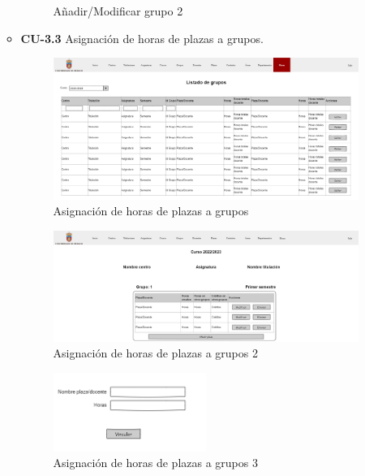 \begin{itemize}
\begin{itemize}
\begin{figure}[!h]
		\caption{Añadir/Modificar grupo 2}
		\end{figure}
		\FloatBarrier
		\newpage
		\item \textbf{CU-3.3} Asignación de horas de plazas a grupos.
		\begin{figure}[!h]
		\centering
		\includegraphics[width=\textwidth]{../img/Anexos/Vistas/horas.png}
		\caption{Asignación de horas de plazas a grupos}
		\end{figure}
		\FloatBarrier
		\begin{figure}[!h]
		\centering
		\includegraphics[width=\textwidth]{../img/Anexos/Vistas/asig_horas_plaza_grupo.png}
		\caption{Asignación de horas de plazas a grupos 2}
		\end{figure}
		\FloatBarrier
		\begin{figure}[!h]
		\centering
		\includegraphics[width=0.5\textwidth]{../img/Anexos/Vistas/asig_horas_plaza_grupo_modal.png}
		\caption{Asignación de horas de plazas a grupos 3}
		\end{figure}
		\FloatBarrier
	\end{itemize}
\end{itemize}


